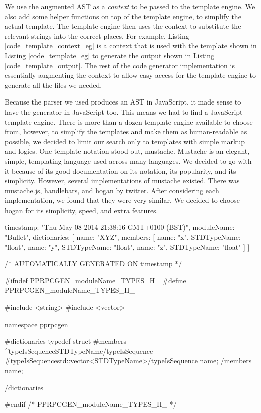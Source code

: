 We use the augmented AST as a \emph{context} to be passed to the template engine. We also add some helper functions on top of the template engine, to simplify the actual template. The template engine then uses the context to substitute the relevant strings into the correct places. For example, Listing \ref{code_template_context_eg} is a context that is used with the template shown in Listing \ref{code_template_eg} to generate the output shown in Listing \ref{code_template_output}. The rest of the code generator implementation is essentially augmenting the context to allow easy access for the template engine to generate all the files we needed.

Because the parser we used produces an AST in JavaScript, it made sense to have the generator in JavaScript too. This means we had to find a JavaScript template engine. There is more than a dozen template engine available to choose from, however, to simplify the templates and make them as human-readable as possible, we decided to limit our search only to templates with simple markup and logics. One template notation stood out, mustache\cite{mustache}. Mustache is an elegant, simple, templating language used across many languages. We decided to go with it because of its good documentation on its notation, its popularity, and its simplicity. However, several implementations of mustache existed. There was mustache.js\cite{mustachejs}, handlebars\cite{handlebarsjs}, and hogan\cite{hoganjs} by twitter. After considering each implementation, we found that they were very similar. We decided to choose hogan for its simplicity, speed, and extra features.

\begin{code}
{
  timestamp: "Thu May 08 2014 21:38:16 GMT+0100 (BST)",
  moduleName: "Bullet",
  dictionaries: [{
    name: "XYZ",
    members: [
      { name: "x", STDTypeName: "float"},
      { name: "y", STDTypeName: "float"},
      { name: "z", STDTypeName: "float"}
    ]
  }]
}
\end{code}

\begin{code}
/* AUTOMATICALLY GENERATED ON {{timestamp}} */

#ifndef PPRPCGEN_{{moduleName}}_TYPES_H_
#define PPRPCGEN_{{moduleName}}_TYPES_H_

#include <string>
#include <vector>

namespace pprpcgen{
{{#dictionaries}}
typedef struct {
  {{#members}}
  {{^typeIsSequence}}{{STDTypeName}}{{/typeIsSequence}}
  {{#typeIsSequence}}std::vector<{{STDTypeName}}>{{/typeIsSequence}}
  {{name}};
  {{/members}}
} {{name}};

{{/dictionaries}}

}

#endif /* PPRPCGEN_{{moduleName}}_TYPES_H_ */

\end{code}

